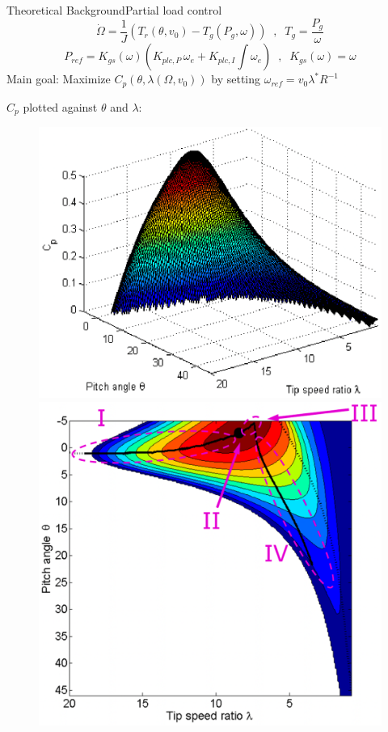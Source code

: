 
\begin{frame}{Theoretical Background}{Partial load control}
	\begin{equation}\label{eq:rotor_speed_deriv}
		\dot{\Omega} = \dfrac{1}{J} \left( T_r(\theta, v_0) - T_g(P_g, \omega) \right) \;\; , \;\; T_g = \dfrac{P_g}{\omega} 
	\end{equation}
	\begin{equation}\label{eq:pi_plc_ctrl}
		P_{ref} = K_{gs}(\omega) \left(K_{plc,P} \, \omega_e + K_{plc,I} \int \omega_e\right) \;\; , \;\; K_{gs}(\omega) = \omega
	\end{equation}
	Main goal: Maximize $ C_p(\theta, \lambda(\Omega, v_0)) $ by setting $ \omega_{ref} = v_0 \lambda^* R^{-1} $
	
	\smallskip
	$ C_p $ plotted against $ \theta $ and $ \lambda $:
	\begin{figure}[ht]
		\centering
		
		\subfloat
		{\includegraphics[width=.53\textwidth]{../Graphics/Cp3dPlotV2.png}%
			\label{fig:cp_plot3d}}
		\hfil
		\subfloat
		{\includegraphics[width=.42\textwidth]{../Graphics/Cp2dPlotRegions.png}%
			\label{fig:cp_plot2d}}
		\label{fig:cp_plot}
	\end{figure}
\end{frame}


